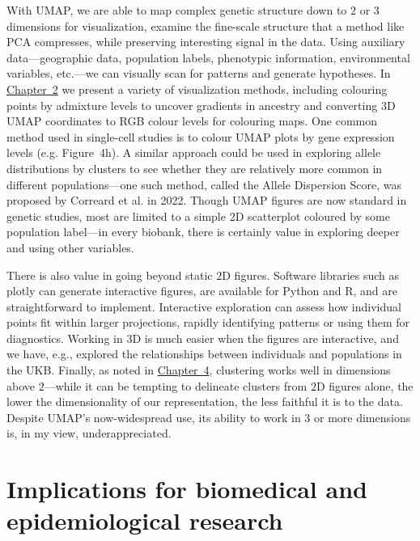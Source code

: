 With UMAP, we are able to map complex genetic structure down to $2$ or $3$ dimensions for visualization, examine the fine-scale structure that a method like PCA compresses, while preserving interesting signal in the data. Using auxiliary data---geographic data, population labels, phenotypic information, environmental variables, etc.---we can visually scan for patterns and generate hypotheses. In \hyperref[chap:chapter2]{Chapter~2} we present a variety of visualization methods, including colouring points by admixture levels to uncover gradients in ancestry and converting 3D UMAP coordinates to RGB colour levels for colouring maps. One common method used in single-cell studies is to colour UMAP plots by gene expression levels (e.g. \citep{jessa_stalled_2019} Figure~4h). A similar approach could be used in exploring allele distributions by clusters to see whether they are relatively more common in different populations---one such method, called the Allele Dispersion Score, was proposed by Correard et al. in 2022\citep{correard_allele_2022}. Though UMAP figures are now standard in genetic studies, most are limited to a simple 2D scatterplot coloured by some population label---in every biobank, there is certainly value in exploring deeper and using other variables.

There is also value in going beyond static $2$D figures. Software libraries such as plotly\citep{plotly} can generate interactive figures, are available for Python and R, and are straightforward to implement. Interactive exploration can assess how individual points fit within larger projections, rapidly identifying patterns or using them for diagnostics. Working in $3$D is much easier when the figures are interactive, and we have, e.g., explored the relationships between individuals and populations in the UKB. Finally, as noted in \hyperref[chap:chapter4]{Chapter~4}, clustering works well in dimensions above $2$---while it can be tempting to delineate clusters from $2$D figures alone, the lower the dimensionality of our representation, the less faithful it is to the data. Despite UMAP's now-widespread use, its ability to work in $3$ or more dimensions is, in my view, underappreciated.

\section{Implications for biomedical and epidemiological research}


